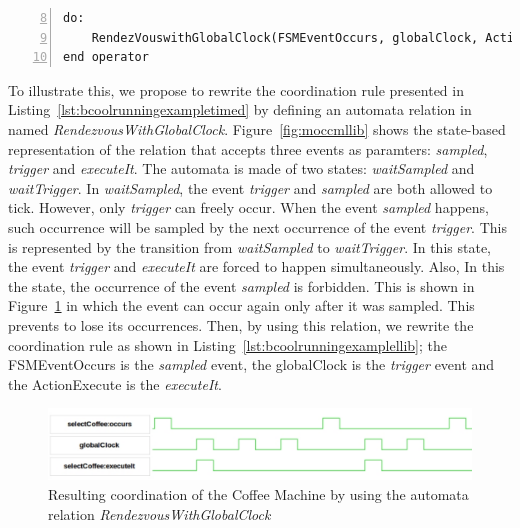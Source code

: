 \begin{lstlisting}[language=bcool,
caption={Synchronized product operator between the TFSM and Activity languages by using the library},
label={lst:bcoolrunningexamplellib}, 
basicstyle=\scriptsize\ttfamily, backgroundcolor=\color{LGrey}, numbers=left, firstnumber=8, xleftmargin=2pt]
do: 
	RendezVouswithGlobalClock(FSMEventOccurs, globalClock, ActionExecute)
end operator
\end{lstlisting}


To illustrate this, we propose to rewrite the coordination rule presented in Listing~\ref{lst:bcoolrunningexampletimed} by defining an automata relation in \moccml named \emph{RendezvousWithGlobalClock}. Figure~\ref{fig:moccmllib} shows the state-based representation of the relation that accepts three events as paramters: \emph{sampled}, \emph{trigger} and \emph{executeIt}. The automata is made of two states: \emph{waitSampled} and \emph{waitTrigger}. In \emph{waitSampled}, the event \emph{trigger} and \emph{sampled} are both allowed to tick. However, only \emph{trigger} can freely occur. When the event \emph{sampled} happens, such occurrence will be sampled by the next occurrence of the event \emph{trigger}. This is represented by the transition from \emph{waitSampled} to \emph{waitTrigger}. In this state, the event \emph{trigger} and \emph{executeIt} are forced to happen simultaneously. Also, In this the state, the occurrence of the event \emph{sampled} is forbidden. This is shown in Figure~\ref{fig:libvcd} in which the event can occur again only after it was sampled. This prevents to lose its occurrences. Then, by using this relation, we rewrite the coordination rule as shown in Listing~\ref{lst:bcoolrunningexamplellib}; the FSMEventOccurs is the \emph{sampled} event, the globalClock is the \emph{trigger} event and the ActionExecute is the \emph{executeIt}.

  
\begin{figure}
	\center
	\includegraphics[width=.9\textwidth]{bcool/figs/libvcd}
	\caption{Resulting coordination of the Coffee Machine by using the automata relation \emph{RendezvousWithGlobalClock}}
	\label{fig:libvcd}
\end{figure}



